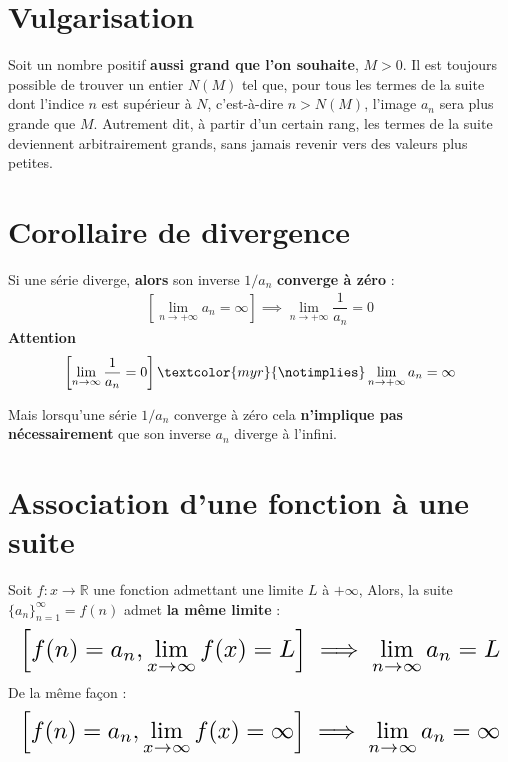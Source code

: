 \documentclass{report}
\begin{document}
\begin{multicols*}{3}
    \section{Vulgarisation}
    Soit un nombre positif \textbf{aussi grand que l'on souhaite}, \(M > 0\). Il est toujours possible 
    de trouver un entier \(N(M)\) tel que, pour tous les termes de la suite dont 
    l'indice \(n\) est supérieur à \(N\), c'est-à-dire \(n > N(M)\), l'image \(a_n\) 
    sera plus grande que \(M\). Autrement dit, à partir d'un certain rang, 
    les termes de la suite deviennent arbitrairement grands, sans jamais 
    revenir vers des valeurs plus petites.

    \section{Corollaire de divergence}
    Si une série diverge, \textbf{alors} son inverse \( 1/a_n \) 
    \textbf{converge à zéro} :
    \begin{align*}
        \left[\lim\limits_{n\to+\infty }a_n  = \infty\right] \implies
     \lim\limits_{n\to+\infty }{\dfrac{1}{a_n}}  = 0
    \end{align*}
    \textcolor{myr}{\textbf{Attention}} 
        \begin{align*}
            \left[\lim\limits_{n\to\infty  }\frac{1}{a_n} = 0 \right]
            \textcolor{myr}{\boldsymbol{\notimplies}}
            \lim\limits_{n\to+\infty }a_n  = \infty
        \end{align*}  

    Mais lorsqu'une série \( 1/a_n \) converge à zéro cela 
    \textbf{n'implique pas nécessairement} que son inverse
    \( a_n \) diverge à l'infini.  

    \section{Association d'une fonction à une suite}
        Soit \( f \colon x \rightarrow \mathbb{R} \) une fonction admettant une limite $L$ à 
        $+\infty$, Alors, la suite 
        $\{a_n\}_{n=1}^{\infty} = f\left(n\right)$ admet \textbf{la même limite} : 
        \begin{align*}
            \resizebox{1\linewidth}{!}{$ 
            \left[f(n) = a_n, \lim\limits_{x\to\infty  }f(x) = L \right]   \implies \lim\limits_{n\to\infty  }a_n = L$}
        \end{align*}
        De la même façon :
        \begin{align*}
            \resizebox{1\linewidth}{!}{$ 
                \left[f(n) = a_n, \lim\limits_{x\to\infty  }f(x) = \infty \right] 
                \implies 
                \lim\limits_{n\to\infty  }a_n = \infty
        $}
        \end{align*}



\end{multicols*}
\end{document}
